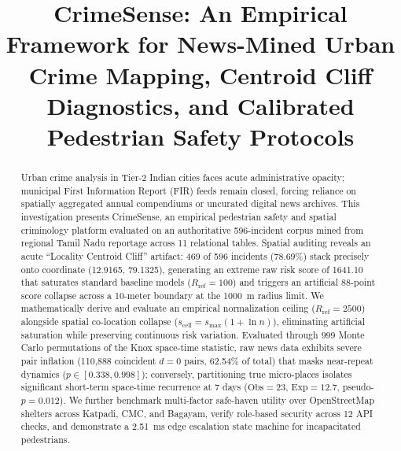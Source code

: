 \documentclass[conference]{IEEEtran}
\begin{document}
\title{CrimeSense: An Empirical Framework for News-Mined Urban Crime Mapping, Centroid Cliff Diagnostics, and Calibrated Pedestrian Safety Protocols}

\author{
}

\maketitle

\begin{abstract}
Urban crime analysis in Tier-2 Indian cities faces acute administrative opacity; municipal First Information Report (FIR) feeds remain closed, forcing reliance on spatially aggregated annual compendiums or uncurated digital news archives. This investigation presents CrimeSense, an empirical pedestrian safety and spatial criminology platform evaluated on an authoritative 596-incident corpus mined from regional Tamil Nadu reportage across 11 relational tables. Spatial auditing reveals an acute ``Locality Centroid Cliff'' artifact: 469 of 596 incidents (78.69\%) stack precisely onto coordinate (12.9165, 79.1325), generating an extreme raw risk score of 1641.10 that saturates standard baseline models ($R_{\text{ref}} = 100$) and triggers an artificial 88-point score collapse across a 10-meter boundary at the 1000~m radius limit. We mathematically derive and evaluate an empirical normalization ceiling ($R_{\text{ref}} = 2500$) alongside spatial co-location collapse ($s_{\text{cell}} = s_{\text{max}}(1+\ln n)$), eliminating artificial saturation while preserving continuous risk variation. Evaluated through 999 Monte Carlo permutations of the Knox space-time statistic, raw news data exhibits severe pair inflation (110,888 coincident $d=0$ pairs, 62.54\% of total) that masks near-repeat dynamics ($p \in [0.338, 0.998]$); conversely, partitioning true micro-places isolates significant short-term space-time recurrence at 7 days ($\text{Obs}=23$, $\text{Exp}=12.7$, pseudo-$p = 0.012$). We further benchmark multi-factor safe-haven utility over OpenStreetMap shelters across Katpadi, CMC, and Bagayam, verify role-based security across 12 API checks, and demonstrate a 2.51~ms edge escalation state machine for incapacitated pedestrians.
\end{abstract}
\end{document}
